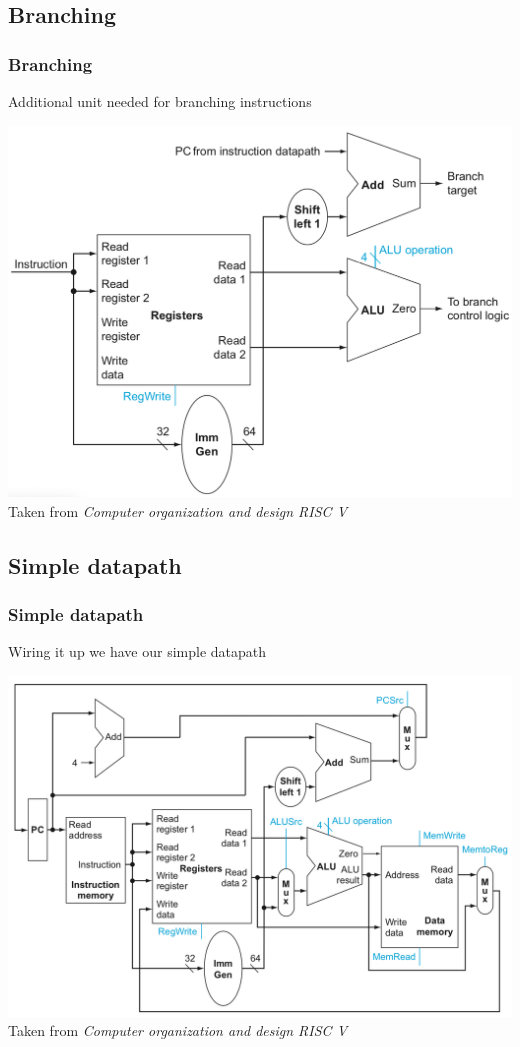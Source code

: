\documentclass{beamer}
\begin{document}
    \begin{frame}
        \subsection{Branching}
        \frametitle{Branching}
        \centering
        \vspace{-0.5cm}
        Additional unit needed for branching instructions
        
        \includegraphics[scale=0.33]{"Pictures and plots/BRANCH"} \\
        \scriptsize{Taken from \textit{Computer organization and design RISC V}}
        
    \end{frame}

    \begin{frame}
        \subsection{Simple datapath}
        \frametitle{Simple datapath}
        \centering
        \vspace{-0.5cm}
        Wiring it up we have our simple datapath
        
        \includegraphics[scale=0.33]{"Pictures and plots/simpledatapath"} \\
        \scriptsize{Taken from \textit{Computer organization and design RISC V}}
        
    \end{frame}
\end{document}
